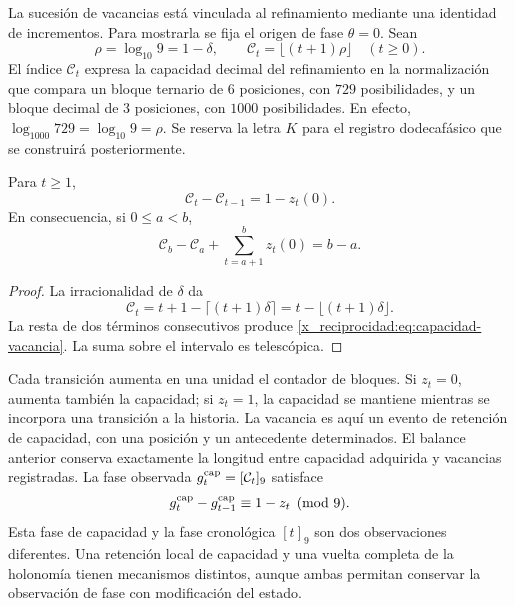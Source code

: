 La sucesión de vacancias está vinculada al refinamiento mediante una
identidad de incrementos. Para mostrarla se fija el origen de fase
\(\theta=0\). Sean
\[
 \rho=\log_{10}9=1-\delta,\qquad
 \mathcal C_t=\lfloor(t+1)\rho\rfloor\quad(t\geq0).
\]
El índice \(\mathcal C_t\) expresa la capacidad decimal del refinamiento
en la normalización que compara un bloque ternario de \(6\) posiciones,
con \(729\) posibilidades, y un bloque decimal de \(3\) posiciones, con
\(1000\) posibilidades. En efecto,
\(\log_{1000}729=\log_{10}9=\rho\). Se reserva la letra \(K\) para
el registro dodecafásico que se construirá posteriormente.

\begin{proposition}
\label{x_reciprocidad:prop:capacidad-vacancia}
Para \(t\geq1\),
\begin{equation}
 \mathcal C_t-\mathcal C_{t-1}=1-z_t(0).
 \label{x_reciprocidad:eq:capacidad-vacancia}
\end{equation}
En consecuencia, si \(0\leq a<b\),
\[
 \mathcal C_b-\mathcal C_a+
 \sum_{t=a+1}^{b}z_t(0)=b-a.
\]
\end{proposition}
\begin{proof}
La irracionalidad de \(\delta\) da
\[
 \mathcal C_t
 =t+1-\lceil(t+1)\delta\rceil
 =t-\lfloor(t+1)\delta\rfloor.
\]
La resta de dos términos consecutivos produce
\eqref{x_reciprocidad:eq:capacidad-vacancia}. La suma sobre el intervalo es telescópica.
\end{proof}

Cada transición aumenta en una unidad el contador de bloques. Si
\(z_t=0\), aumenta también la capacidad; si \(z_t=1\), la capacidad se
mantiene mientras se incorpora una transición a la historia. La vacancia
es aquí un evento de retención de capacidad, con una posición y un
antecedente determinados. El balance anterior conserva exactamente la
longitud entre capacidad adquirida y vacancias registradas. La fase
observada \(g_t^{\rm cap}=[\mathcal C_t]_9\) satisface
\[
 g_t^{\rm cap}-g_{t-1}^{\rm cap}\equiv1-z_t\pmod9.
\]
Esta fase de capacidad y la fase cronológica \([t]_9\) son dos
observaciones diferentes. Una retención local de capacidad y una vuelta
completa de la holonomía tienen mecanismos distintos, aunque ambas
permitan conservar la observación de fase con modificación del estado.

